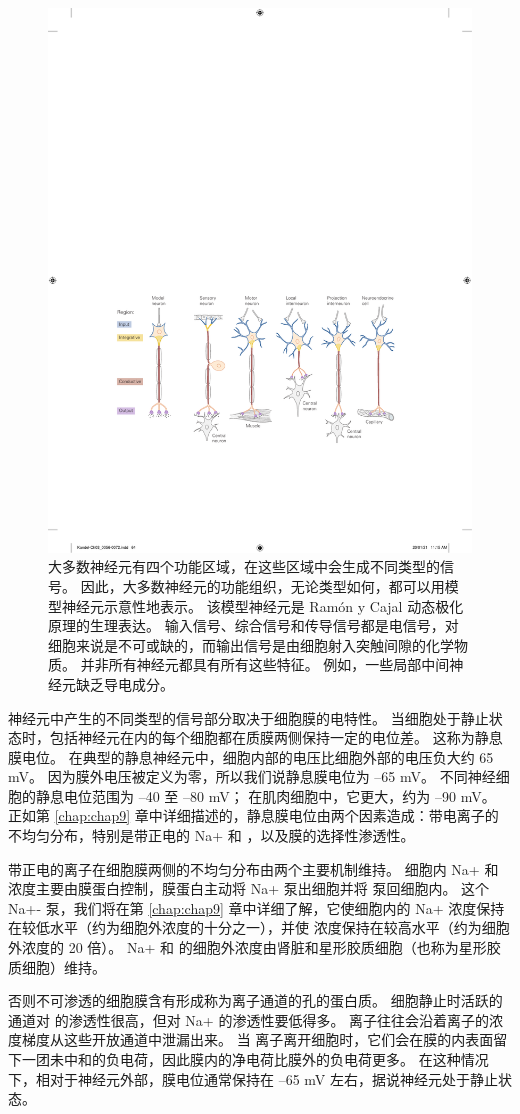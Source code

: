 \begin{figure}[htbp]
	\centering
	\includegraphics[width=0.5\linewidth]{chap03/fig_3_8}
	\caption{大多数神经元有四个功能区域，在这些区域中会生成不同类型的信号。 
		因此，大多数神经元的功能组织，无论类型如何，都可以用模型神经元示意性地表示。 
		该模型神经元是 Ramón y Cajal 动态极化原理的生理表达。 
		输入信号、综合信号和传导信号都是电信号，对细胞来说是不可或缺的，而输出信号是由细胞射入突触间隙的化学物质。 
		并非所有神经元都具有所有这些特征。 
		例如，一些局部中间神经元缺乏导电成分。}
	\label{fig:3_8}
\end{figure}


神经元中产生的不同类型的信号部分取决于细胞膜的电特性。 
当细胞处于静止状态时，包括神经元在内的每个细胞都在质膜两侧保持一定的电位差。 
这称为静息膜电位。 
在典型的静息神经元中，细胞内部的电压比细胞外部的电压负大约 65 mV。 
因为膜外电压被定义为零，所以我们说静息膜电位为 –65 mV。 
不同神经细胞的静息电位范围为 –40 至 –80 mV； 
在肌肉细胞中，它更大，约为 –90 mV。 
正如第 \ref{chap:chap9} 章中详细描述的，静息膜电位由两个因素造成：带电离子的不均匀分布，特别是带正电的 Na+ 和 ，以及膜的选择性渗透性。


带正电的离子在细胞膜两侧的不均匀分布由两个主要机制维持。 
细胞内 Na+ 和  浓度主要由膜蛋白控制，膜蛋白主动将 Na+ 泵出细胞并将  泵回细胞内。 
这个 Na+- 泵，我们将在第 \ref{chap:chap9} 章中详细了解，它使细胞内的 Na+ 浓度保持在较低水平（约为细胞外浓度的十分之一），并使  浓度保持在较高水平（约为细胞外浓度的 20 倍）。 
Na+ 和  的细胞外浓度由肾脏和星形胶质细胞（也称为星形胶质细胞）维持。


否则不可渗透的细胞膜含有形成称为离子通道的孔的蛋白质。 细胞静止时活跃的通道对  的渗透性很高，但对 Na+ 的渗透性要低得多。 
 离子往往会沿着离子的浓度梯度从这些开放通道中泄漏出来。 
当  离子离开细胞时，它们会在膜的内表面留下一团未中和的负电荷，因此膜内的净电荷比膜外的负电荷更多。 
在这种情况下，相对于神经元外部，膜电位通常保持在 –65 mV 左右，据说神经元处于静止状态。


